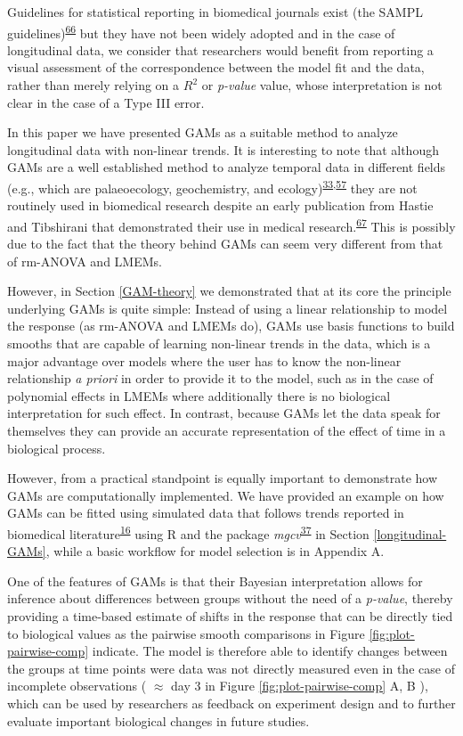 \documentclass[
]{article}
\begin{document}
Guidelines for statistical reporting in biomedical journals exist (the SAMPL guidelines)\textsuperscript{\protect\hyperlink{ref-lang2015}{66}} but they have not been widely adopted and in the case of longitudinal data, we consider that researchers would benefit from reporting a visual assessment of the correspondence between the model fit and the data, rather than merely relying on a \(R^2\) or \emph{p-value} value, whose interpretation is not clear in the case of a Type III error.

In this paper we have presented GAMs as a suitable method to analyze longitudinal data with non-linear trends. It is interesting to note that although GAMs are a well established method to analyze temporal data in different fields (e.g., which are palaeoecology, geochemistry, and ecology)\textsuperscript{\protect\hyperlink{ref-pedersen2019}{33},\protect\hyperlink{ref-hefley2017}{57}} they are not routinely used in biomedical research despite an early publication from Hastie and Tibshirani that demonstrated their use in medical research.\textsuperscript{\protect\hyperlink{ref-hastie1995}{67}} This is possibly due to the fact that the theory behind GAMs can seem very different from that of rm-ANOVA and LMEMs.

However, in Section \ref{GAM-theory} we demonstrated that at its core the principle underlying GAMs is quite simple: Instead of using a linear relationship to model the response (as rm-ANOVA and LMEMs do), GAMs use basis functions to build smooths that are capable of learning non-linear trends in the data, which is a major advantage over models where the user has to know the non-linear relationship \emph{a priori} in order to provide it to the model, such as in the case of polynomial effects in LMEMs where additionally there is no biological interpretation for such effect. In contrast, because GAMs let the data speak for themselves they can provide an accurate representation of the effect of time in a biological process.

However, from a practical standpoint is equally important to demonstrate how GAMs are computationally implemented. We have provided an example on how GAMs can be fitted using simulated data that follows trends reported in biomedical literature\textsuperscript{\protect\hyperlink{ref-vishwanath2009}{16}} using R and the package \emph{mgcv}\textsuperscript{\protect\hyperlink{ref-wood2017}{37}} in Section \ref{longitudinal-GAMs}, while a basic workflow for model selection is in Appendix A.

One of the features of GAMs is that their Bayesian interpretation allows for inference about differences between groups without the need of a \emph{p-value}, thereby providing a time-based estimate of shifts in the response that can be directly tied to biological values as the pairwise smooth comparisons in Figure \ref{fig:plot-pairwise-comp} indicate. The model is therefore able to identify changes between the groups at time points were data was not directly measured even in the case of incomplete observations ( \(\approx\) day 3 in Figure \ref{fig:plot-pairwise-comp} A, B ), which can be used by researchers as feedback on experiment design and to further evaluate important biological changes in future studies.
\end{document}
